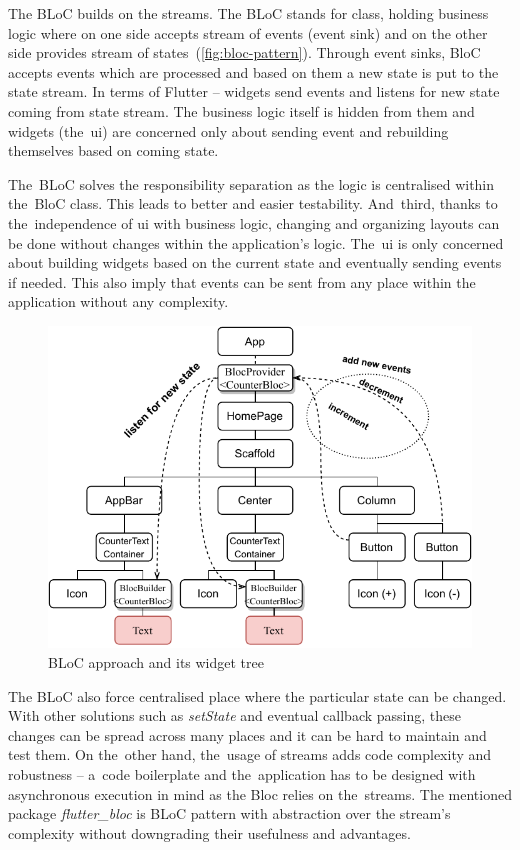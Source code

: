 The BLoC builds on the streams. The BLoC stands for class, holding business logic where on one side accepts stream of events (event sink) and on the other side provides stream of states~(\cref{fig:bloc-pattern}). Through event sinks, BloC accepts events which are processed and based on them a new state is put to the state stream. In terms of Flutter -- widgets send events and listens for new state coming from state stream. The business logic itself is hidden from them and widgets (the~\gls{ui}) are concerned only about sending event and rebuilding themselves based on coming state.

The~BLoC solves the responsibility separation as the logic is centralised within the~BloC class. This leads to better and easier testability. And~third, thanks to the~independence of \gls{ui} with business logic, changing and organizing layouts can be done without changes within the application's logic. The~\gls{ui} is only concerned about building widgets based on the current state and eventually sending events if needed. This also imply that events can be sent from any place within the application without any complexity.

\begin{figure}[ht]
    \centering
    \includegraphics[width=0.75\linewidth]{img/flutter/counter-bloc.pdf}
    \caption{BLoC approach and its widget tree}
    \label{fig:counter-app-bloc}
\end{figure}

The BLoC also force centralised place where the particular state can be changed. With other solutions such as \textit{setState} and eventual callback passing, these changes can be spread across many places and it can be hard to maintain and test them. On the~other hand, the~usage of streams adds code complexity and robustness -- a~code boilerplate and the~application has to be designed with asynchronous execution in mind as the Bloc relies on the~streams. The mentioned package \textit{flutter\_bloc} is BLoC pattern with abstraction over the stream's complexity without downgrading their usefulness and advantages. 

